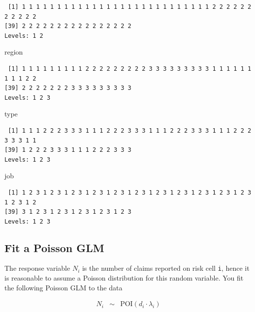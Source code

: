 \documentclass[
]{book}
\newenvironment{Shaded}{\begin{snugshade}}{\end{snugshade}}
\newcommand{\NormalTok}[1]{#1}
\begin{document}
\begin{verbatim}
 [1] 1 1 1 1 1 1 1 1 1 1 1 1 1 1 1 1 1 1 1 1 1 1 1 1 1 1 1 2 2 2 2 2 2 2 2 2 2 2
[39] 2 2 2 2 2 2 2 2 2 2 2 2 2 2 2 2
Levels: 1 2
\end{verbatim}

\begin{Shaded}
\begin{Highlighting}[]
\NormalTok{region}
\end{Highlighting}
\end{Shaded}

\begin{verbatim}
 [1] 1 1 1 1 1 1 1 1 1 2 2 2 2 2 2 2 2 2 3 3 3 3 3 3 3 3 3 1 1 1 1 1 1 1 1 1 2 2
[39] 2 2 2 2 2 2 2 3 3 3 3 3 3 3 3 3
Levels: 1 2 3
\end{verbatim}

\begin{Shaded}
\begin{Highlighting}[]
\NormalTok{type}
\end{Highlighting}
\end{Shaded}

\begin{verbatim}
 [1] 1 1 1 2 2 2 3 3 3 1 1 1 2 2 2 3 3 3 1 1 1 2 2 2 3 3 3 1 1 1 2 2 2 3 3 3 1 1
[39] 1 2 2 2 3 3 3 1 1 1 2 2 2 3 3 3
Levels: 1 2 3
\end{verbatim}

\begin{Shaded}
\begin{Highlighting}[]
\NormalTok{job}
\end{Highlighting}
\end{Shaded}

\begin{verbatim}
 [1] 1 2 3 1 2 3 1 2 3 1 2 3 1 2 3 1 2 3 1 2 3 1 2 3 1 2 3 1 2 3 1 2 3 1 2 3 1 2
[39] 3 1 2 3 1 2 3 1 2 3 1 2 3 1 2 3
Levels: 1 2 3
\end{verbatim}

\hypertarget{fit-a-poisson-glm}{%
\subsection{Fit a Poisson GLM}\label{fit-a-poisson-glm}}

The response variable \(N_i\) is the number of claims reported on risk cell \texttt{i}, hence it is reasonable to assume a Poisson distribution for this random variable. You fit the following Poisson GLM to the data

\begin{eqnarray*}
N_i &\sim& \text{POI}(d_i \cdot \lambda_i) 
\end{eqnarray*}
\end{document}
